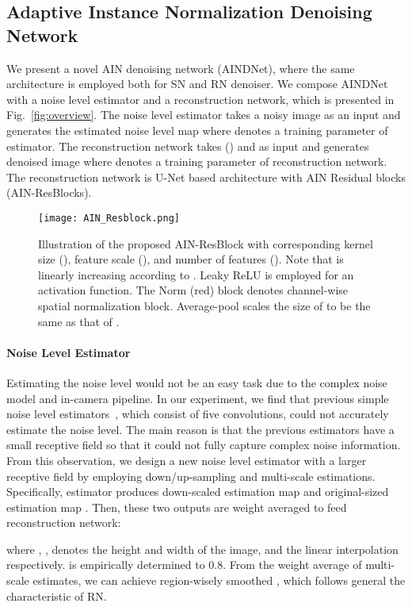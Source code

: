 \documentclass[10pt,twocolumn,letterpaper]{article}
\begin{document}
 


\subsection{Adaptive Instance Normalization Denoising Network}
We present a novel AIN denoising network (AINDNet), where the same architecture is employed both for SN and RN denoiser.
We compose AINDNet with a noise level estimator and a reconstruction network, which is presented in Fig.~\ref{fig:overview}.
The noise level estimator takes a noisy image  as an input and generates the estimated noise level map
 where  denotes a training parameter of estimator.
The reconstruction network takes () and  as input and generates denoised image  where  denotes a training parameter of reconstruction network.
The reconstruction network is U-Net based architecture with AIN Residual blocks (AIN-ResBlocks).

\begin{figure}[t]
	\centering				
	\texttt{[image: AIN\_Resblock.png]} 
	\caption{Illustration of the proposed AIN-ResBlock with corresponding kernel size (), feature scale (), and number of features (). Note that  is linearly increasing according to . Leaky ReLU is employed for an activation function. The Norm (red) block denotes channel-wise spatial normalization block. Average-pool scales the size of  to be the same as that of .}	
	\label{fig:AIN_Resblock}	
\end{figure}

\paragraph{Noise Level Estimator}
Estimating the noise level would not be an easy task due to the complex noise model and in-camera pipeline.
In our experiment, we find that previous simple noise level estimators~\cite{guo2019toward,brooks2019unprocessing}, which consist of five convolutions, could not accurately estimate the noise level.
The main reason is that the previous estimators have a small receptive field so that it could not fully capture complex noise information.
From this observation, we design a new noise level estimator with a larger receptive field by employing down/up-sampling and multi-scale estimations.
Specifically, estimator produces down-scaled estimation map  and original-sized estimation map .
Then, these two outputs are weight averaged to feed reconstruction network:

where , ,  denotes the height and width of the image, and the linear interpolation respectively.
 is empirically determined to 0.8.
From the weight average of multi-scale estimates, we can achieve region-wisely smoothed , 
which follows general the characteristic of RN.
\end{document}
